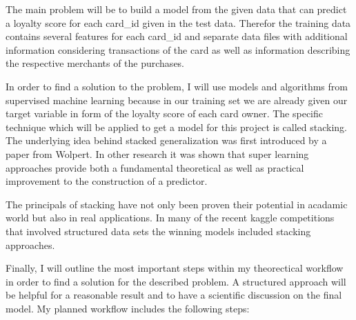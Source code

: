 \documentclass{article}
\begin{document}
The main problem will be to build a model from the given data that can predict a loyalty score for each card\_id given in the test data. Therefor the training data contains several features for each card\_id and separate data files with additional information considering transactions of the card as well as information describing the respective merchants of the purchases.

In order to find a solution to the problem, I will use models and algorithms from supervised machine learning because in our training set we are already given our target variable in form of the loyalty score of each card owner. The specific technique which will be applied to get a model for this project is called stacking. The underlying idea behind stacked generalization was first introduced by a paper \cite{stacked} from Wolpert. In other research \cite{super} it was shown that super learning approaches provide both a fundamental theoretical as well as practical improvement to the construction of a predictor. 

The principals of stacking have not only been proven their potential in acadamic world but also in real applications. In many of the recent kaggle competitions that involved structured data sets the winning models included stacking approaches.

Finally, I will outline the most important steps within my theorectical workflow in order to find a solution for the described problem. A structured approach will be helpful for a reasonable result and to have a scientific discussion on the final model. My planned workflow includes the following steps:
\end{document}
